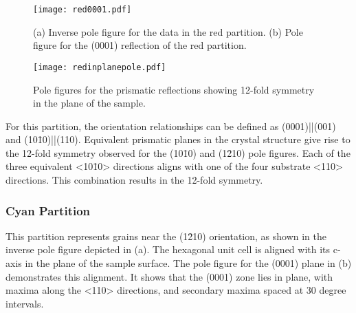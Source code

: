 \begin{figure}
	\centering
	\texttt{[image: red0001.pdf]}
	\caption[Orientation analysis for red partition]{%
		(a) Inverse pole figure for the data in the red partition. (b) Pole 
		figure for the (0001) reflection of the red partition.}
	\label{fig:red0001}
\end{figure}
\begin{figure}
	\centering
	\texttt{[image: redinplanepole.pdf]}
	\caption[Pole figures for prismatic reflections]{%
		Pole figures for the prismatic reflections showing 12-fold 
		symmetry in the plane of the sample.}
	\label{fig:redinplanepole}

\end{figure}

For this partition, the orientation relationships can be defined as (0001)||(001) and (10\={1}0)||(110). Equivalent prismatic planes in the  crystal structure give rise to the 12-fold symmetry observed for the (10\={1}0) and (1\={2}10) pole figures. Each of the three equivalent <10\={1}0> directions aligns with one of the four substrate <110> directions. This combination results in the 12-fold symmetry.


\subsubsection{Cyan Partition}
\label{subsubsec:single.growth.cyan}



%
%
			
This partition represents grains near  the (1\={2}10) orientation, as shown in the inverse pole figure depicted in (a). The hexagonal unit cell is aligned with its c-axis in the plane of the sample surface. The pole figure for the (0001) plane in (b) demonstrates this alignment. It shows that the (0001) zone lies in plane, with maxima along the <110> directions, and secondary maxima spaced at 30 degree intervals.

